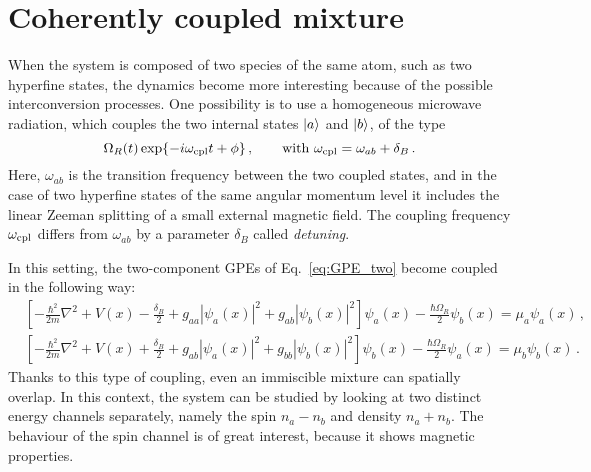 \section{Coherently coupled mixture}
When the system is composed of two species of the same atom, such as two hyperfine states, the dynamics become more interesting because of the possible interconversion processes. One possibility is to use a homogeneous microwave radiation, which couples the two internal states $\ket{a}$ and $\ket{b}$, of the type
\begin{equation*}
    \Omega_R(t) \exp{-i\omega_{\rm cpl}t + \phi}\, ,\qquad \text{with }
    \omega_{\rm cpl} = \omega_{ab} + \delta_B\, .
\end{equation*}
Here, $\omega_{ab}$ is the transition frequency between the two coupled states, and in the case of two hyperfine states of the same angular momentum level it includes the linear Zeeman splitting of a small external magnetic field. The coupling frequency $\omega_{\rm cpl}$ differs from $\omega_{ab}$ by a parameter $\delta_B$ called \textit{detuning}.

In this setting, the two-component GPEs of Eq.\ \eqref{eq:GPE_two} become coupled in the following way:
\begin{equation}
    \begin{aligned}
        &\left[ -\frac{\hbar^2}{2m}\nabla^2 + V(x) - \frac{\delta_B}{2} + g_{aa}|\psi_a(x)|^2 + g_{ab}|\psi_b(x)|^2
        \right] \psi_a(x) - \frac{\hbar\Omega_R}{2}\psi_b(x) = \mu_a \psi_a(x)\, , \\
        &\left[ -\frac{\hbar^2}{2m}\nabla^2 + V(x) + \frac{\delta_B}{2} + g_{ab}|\psi_a(x)|^2 + g_{bb}|\psi_b(x)|^2
        \right] \psi_b(x) - \frac{\hbar\Omega_R}{2}\psi_a(x) = \mu_b \psi_b(x)\, .
    \end{aligned}
    \label{eq:GPE_coupled}
\end{equation}
Thanks to this type of coupling, even an immiscible mixture can spatially overlap. In this context, the system can be studied by looking at two distinct energy channels separately, namely the spin $n_a-n_b$ and density $n_a+n_b$. The behaviour of the spin channel is of great interest, because it shows magnetic properties.

